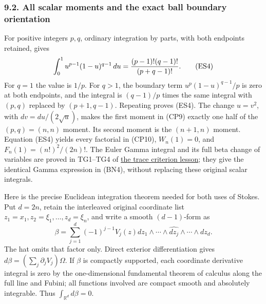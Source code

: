 \documentclass[
  11pt,
]{article}
\begin{document}
\subsubsection{9.2. All scalar moments and the exact ball boundary
orientation}\label{all-scalar-moments-and-the-exact-ball-boundary-orientation}

For positive integers \(p,q\), ordinary integration by parts, with both
endpoints retained, gives \[
 \int_0^1 u^{p-1}(1-u)^{q-1}\,du
 ={(p-1)!(q-1)!\over(p+q-1)!}.
 \tag{ES4}
\] For \(q=1\) the value is \(1/p\). For \(q>1\), the boundary term
\(u^p(1-u)^{q-1}/p\) is zero at both endpoints, and the integral is
\((q-1)/p\) times the same integral with \((p,q)\) replaced by
\((p+1,q-1)\). Repeating proves (ES4). The change \(u=v^2\), with
\(dv=du/(2\sqrt u)\), makes the first moment in (CP9) exactly one half
of the \((p,q)=(n,n)\) moment. Its second moment is the \((n+1,n)\)
moment. Equation (ES4) yields every factorial in (CP10), \(W_n(1)=0\),
and \(F_n(1)=(n!)^2/(2n)!\). The Euler Gamma integral and its full beta
change of variables are proved in TG1--TG4 of
\href{weyl-trace-criterion.pdf}{the trace criterion lesson}; they give
the identical Gamma expression in (BN4), without replacing these
original scalar integrals.

Here is the precise Euclidean integration theorem needed for both uses
of Stokes. Put \(d=2n\), retain the interleaved original coordinate list
\(z_1=x_1,z_2=\xi_1,\ldots,z_d=\xi_n\), and write a smooth
\((d-1)\)-form as \[
 \beta=\sum_{j=1}^d(-1)^{j-1}V_j(z)
       dz_1\wedge\cdots\wedge\widehat{dz_j}
                      \wedge\cdots\wedge dz_d.
 \tag{ES5}
\] The hat omits that factor only. Direct exterior differentiation gives
\(d\beta=(\sum_j\partial_jV_j)\Omega\). If \(\beta\) is compactly
supported, each coordinate derivative integral is zero by the
one-dimensional fundamental theorem of calculus along the full line and
Fubini; all functions involved are compact smooth and absolutely
integrable. Thus \(\int_{\mathbb R^d}d\beta=0\).
\end{document}
